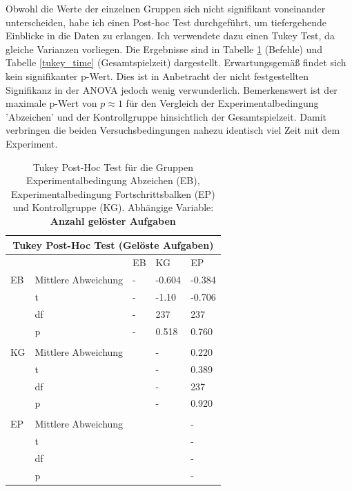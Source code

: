 Obwohl die Werte der einzelnen Gruppen sich nicht signifikant voneinander unterscheiden, habe ich einen Post-hoc Test durchgeführt, um tiefergehende Einblicke in die Daten zu erlangen. Ich verwendete dazu einen Tukey Test, da gleiche Varianzen vorliegen. Die Ergebnisse sind in Tabelle \ref{tukey_subs} (Befehle) und Tabelle \ref{tukey_time} (Gesamtspielzeit) dargestellt. Erwartungsgemäß findet sich kein signifikanter p-Wert. Dies ist in Anbetracht der nicht festgestellten Signifikanz in der ANOVA jedoch wenig verwunderlich. Bemerkenswert ist der maximale p-Wert von $p\approx1$ für den Vergleich der Experimentalbedingung 'Abzeichen' und der Kontrollgruppe hinsichtlich der Gesamtspielzeit. Damit verbringen die beiden Versuchsbedingungen nahezu identisch viel Zeit mit dem Experiment.



\begin{table}[htbp]
\centering
\begin{tabular}{ p{2cm} p{4cm} p{2.0cm} p{2.0cm} p{2.0cm} }
 \hline
 \multicolumn{5}{c}{Tukey Post-Hoc Test (Gelöste Aufgaben)} \\
 \hline
 & & EB & KG & EP \\
 \hline
  EB    &   Mittlere Abweichung     & -     & -0.604        & -0.384          \\
        &   t                       & -     & -1.10         & -0.706          \\
        &   df                      & -     & 237           & 237              \\
        &   p                       & -     & 0.518         & 0.760     \\
  & & & &\\
  KG    &   Mittlere Abweichung     &       & -    & 0.220         \\
        &   t                       &       & -    & 0.389         \\
        &   df                      &       & -    & 237            \\
        &   p                       &       & -    & 0.920          \\
  & & & &\\
  EP    &   Mittlere Abweichung     &       &       & - \\
        &   t                       &       &       & - \\
        &   df                      &       &       & - \\
        &   p                       &       &       & - \\
  
 \hline
\end{tabular}
\caption{Tukey Post-Hoc Test für die Gruppen Experimentalbedingung Abzeichen (EB), Experimentalbedingung Fortschrittsbalken (EP) und Kontrollgruppe (KG). Abhängige Variable: \textbf{Anzahl gelöster Aufgaben}}
\label{tukey_subs}
\end{table}


